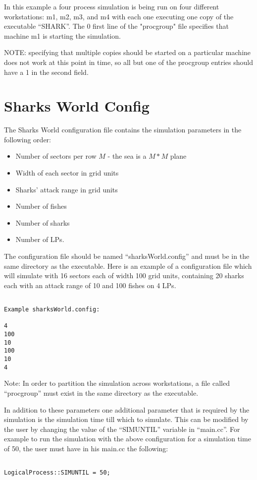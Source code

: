 In this example a four process simulation is being run on four different
workstations: m1, m2, m3, and m4 with each one executing one copy of the
executable ``SHARK''.  The 0 first line of the "procgroup" file specifies
that machine m1 is starting the simulation.

NOTE: specifying that multiple copies should be started on a particular
machine does not work at this point in time, so all but one of the
procgroup entries should have a 1 in the second field.

\section*{Sharks World Config}

The Sharks World configuration file contains the simulation parameters in
the following order:
\begin{itemize}
\item Number of sectors per row $M$ - the sea is a $M * M$ plane
\item Width of each sector in grid units
\item Sharks' attack range in grid units
\item Number of fishes
\item Number of sharks
\item Number of LPs.

\end{itemize}

The configuration file should be named ``sharksWorld.config'' and must be
in the same directory as the executable. Here is an example of a
configuration file which will simulate with 16 sectors each of width 100
grid units, containing 20 sharks each with an attack range of 10 and 100
fishes on 4 LPs.

\begin{verbatim}

Example sharksWorld.config:

4
100
10
100
10
4

\end{verbatim}

Note: In order to partition the simulation across workstations, a file
called ``procgroup'' must exist in the same directory as the executable.

In addition to these parameters one additional parameter that is required
by the simulation is the simulation time till which to simulate. This can
be modified by the user by changing the value of the ``SIMUNTIL'' variable
in ``main.cc''. For example to run the simulation with the above
configuration for a simulation time of 50, the user must have in his
main.cc the following:
\begin{verbatim}

LogicalProcess::SIMUNTIL = 50;
 
\end{verbatim}

